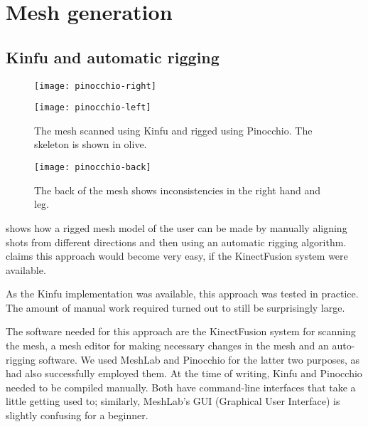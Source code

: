 \section{Mesh generation}


\subsection{Kinfu and automatic rigging}

\begin{figure}
    \centering
    \begin{minipage}{0.49\textwidth}
        \texttt{[image: pinocchio-right]}
    \end{minipage}
    \begin{minipage}{0.49\textwidth}
        \texttt{[image: pinocchio-left]}
    \end{minipage}
    \caption{The mesh scanned using Kinfu and rigged using Pinocchio. The skeleton is shown in olive.}
    \label{fig:hannu-front}
\end{figure}

\begin{figure}
    \centering
    \texttt{[image: pinocchio-back]}
    \caption{The back of the mesh shows inconsistencies in the right hand and leg.}
    \label{fig:hannu-back}
\end{figure}

\citet{charpentier2011accurate} shows how a rigged mesh model of the user can be made by manually aligning shots from different directions and then using an automatic rigging algorithm. \citeauthor{charpentier2011accurate} claims this approach would become very easy, if the KinectFusion system were available.

As the Kinfu implementation was available, this approach was tested in practice. The amount of manual work required turned out to still be surprisingly large.

The software needed for this approach are the KinectFusion system for scanning the mesh, a mesh editor for making necessary changes in the mesh and an auto-rigging software. We used MeshLab and Pinocchio for the latter two purposes, as \citet{charpentier2011accurate} had also successfully employed them. At the time of writing, Kinfu and Pinocchio needed to be compiled manually. Both have command-line interfaces that take a little getting used to; similarly, MeshLab's GUI (Graphical User Interface) is slightly confusing for a beginner.

